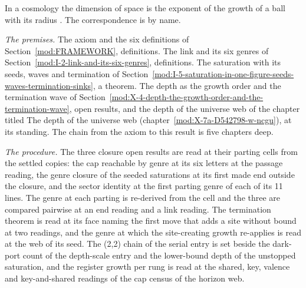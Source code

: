 \begin{chbridge}
In a cosmology the dimension of space is the exponent of the growth of a ball with its radius \cite{Friedmann1922,Weinberg1995}. The correspondence is by name.
\end{chbridge}
\begin{chproof}
\textit{The premises.} The axiom and the six definitions of Section~\ref{mod:FRAMEWORK}, definitions. The link and its six genres of Section~\ref{mod:I-2-link-and-its-six-genres}, definitions. The saturation with its seeds, waves and termination of Section~\ref{mod:I-5-saturation-in-one-figure-seeds-waves-termination-sinks}, a theorem. The depth as the growth order and the termination wave of Section~\ref{mod:X-4-depth-the-growth-order-and-the-termination-wave}, open results, and the depth of the universe web of the chapter titled The depth of the universe web (chapter~\ref{mod:X-7a-D542798-w-ncgu}), at its standing. The chain from the axiom to this result is five chapters deep.

\textit{The procedure.} The three closure open results are read at their parting cells from the settled copies: the cap reachable by genre at its six letters at the passage reading, the genre closure of the seeded saturations at its first made end outside the closure, and the sector identity at the first parting genre of each of its 11 lines. The genre at each parting is re-derived from the cell and the three are compared pairwise at an end reading and a link reading. The termination theorem is read at its face naming the first move that adds a site without bound at two readings, and the genre at which the site-creating growth re-applies is read at the web of its seed. The (2,2) chain of the serial entry is set beside the dark-port count of the depth-scale entry and the lower-bound depth of the unstopped saturation, and the register growth per rung is read at the shared, key, valence and key-and-shared readings of the cap census of the horizon web.


\end{chproof}

